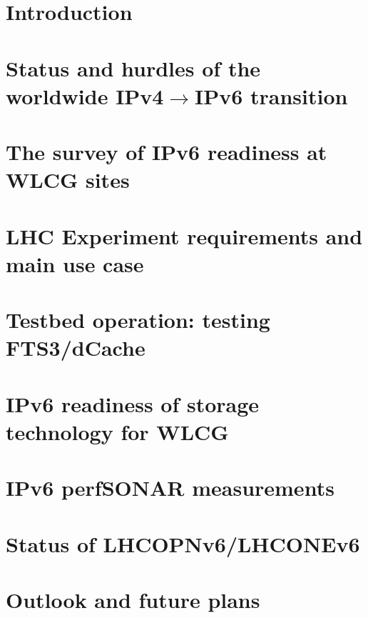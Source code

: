 \documentclass[a4paper]{jpconf}
\begin{document}
\section{Introduction}


\section{Status and hurdles of the worldwide IPv4$\rightarrow$IPv6 transition}


\section{The survey of IPv6 readiness at WLCG sites}


\section{LHC Experiment requirements and main use case}


\section{Testbed operation: testing FTS3/dCache}


\section{IPv6 readiness of storage technology for WLCG}


\section{IPv6 perfSONAR measurements}


\section{Status of LHCOPNv6/LHCONEv6}


\section{Outlook and future plans}



\par

\end{document}
